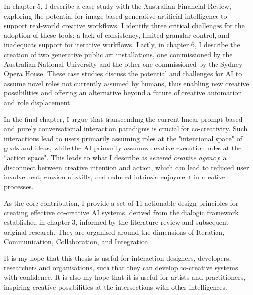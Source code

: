In chapter 5, I describe a case study with the Australian Financial Review, exploring the potential for image-based generative artificial intelligence to support real-world creative workflows. I identify three critical challenges for the adoption of these tools: a lack of consistency, limited granular control, and inadequate support for iterative workflows. Lastly, in chapter 6, I describe the creation of two generative public art installations, one commissioned by the Australian National University and the other one commissioned by the Sydney Opera House. These case studies discuss the potential and challenges for AI to assume novel roles not currently assumed by humans, thus enabling new creative possibilities and offering an alternative beyond a future of creative automation and role displacement.

In the final chapter, I argue that transcending the current linear prompt-based and purely conversational interaction paradigms is crucial for co-creativity. Such interactions lead to users primarily assuming roles at the "intentional space" of goals and ideas, while the AI primarily assumes creative execution roles at the “action space". This leads to what I describe as \textit{severed creative agency}: a disconnect between creative intention and action, which can lead to reduced user involvement, erosion of skills, and reduced intrinsic enjoyment in creative processes.

As the core contribution, I provide a set of 11 actionable design principles for creating effective co-creative AI systems, derived from the dialogic framework established in chapter 3, informed by the literature review and subsequent original research. They are organised around the dimensions of Iteration, Communication, Collaboration, and Integration. 

It is my hope that this thesis is useful for interaction designers, developers, researchers and organisations, such that they can develop co-creative systems with confidence. It is also my hope that it is useful for artists and practitioners, inspiring creative possibilities at the intersections with other intelligences.